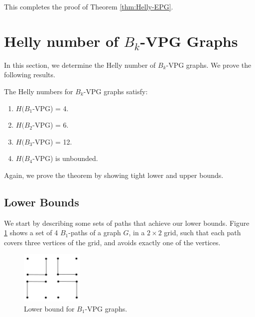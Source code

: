 
This completes the proof of Theorem \ref{thm:Helly-EPG}. 


\section{Helly number of $B_k$-VPG Graphs}\label{sec:HellynumberVPG}

In this section, we determine the Helly number of $B_k$-VPG graphs. We prove the following results.
\begin{theorem}\label{thm:Bk-VPG}
The Helly numbers for $B_k$-VPG graphs satisfy:
\begin{enumerate}
\item $H(B_1$-VPG) = 4.
\item $H(B_2$-VPG) = 6.
\item $H(B_3$-VPG) = 12.
\item $H(B_4$-VPG) is unbounded.
\end{enumerate}
\end{theorem}

Again, we prove the theorem by showing tight lower and upper bounds.

\subsection{Lower Bounds}

We start by describing some sets of paths that achieve our lower bounds. 
Figure \ref{VPG:lower-B1} shows a set of 4 $B_1$-paths of a graph $G$, in a $2 \times 2$ grid, such that each path covers three vertices of the grid, and avoids exactly one of the vertices. 

\begin{figure}[!h]
    \centering
    \includegraphics[width=3cm]{./img/lower-bound-B1-VPG.pdf}
    \caption{Lower bound for $B_1$-VPG graphs.}
    \label{VPG:lower-B1}
\end{figure}

